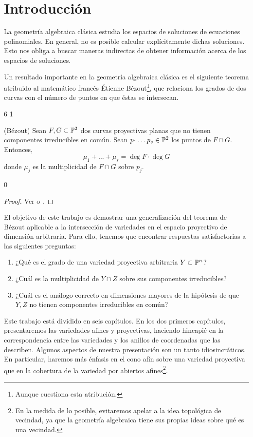 \chapter*{Introducción}

\noindent La geometría algebraica clásica estudia los espacios de soluciones de ecuaciones polinomiales. En general, no es posible calcular explícitamente dichas soluciones. Esto nos obliga a buscar maneras indirectas de obtener información acerca de los espacios de soluciones.

Un resultado importante en la geometría algebraica clásica es el siguiente teorema atribuido al matemático francés Étienne Bézout\footnote{Aunque \cite[p. 51]{kirwan} cuestiona esta atribución.}, que relaciona los grados de dos curvas con el número de puntos en que éstas se intersecan.

\setcounter{chapter} 6
\setcounter{counter} 1
\begin{theorem}
(Bézout) Sean $F, G \subset \P^2$ dos curvas proyectivas planas que no tienen componentes irreducibles en común. Sean $p_1 \dots p_s \in \P^2$ los puntos de $F \cap G$. Entonces,
$$\mu_1 + \dots + \mu_s = \deg F \cdot \deg G$$
donde $\mu_j$ es la multiplicidad de $F \cap G$ sobre $p_j$.
\end{theorem}
\setcounter{chapter} 0

\begin{proof}
Ver \cite[pp. 112-115]{fulton} o \cite[pp. 62-63]{kirwan}.
\end{proof}

El objetivo de este trabajo es demostrar una generalización del teorema de Bézout aplicable a la intersección de variedades en el espacio proyectivo de dimensión arbitraria. Para ello, tenemos que encontrar respuestas satisfactorias a las siguientes preguntas:

\begin{enumerate}
    \item ¿Qué es el grado de una variedad proyectiva arbitraria $Y \subset \P^n$?
    \item ¿Cuál es la multiplicidad de $Y \cap Z$ sobre sus componentes irreducibles?
    \item ¿Cuál es el análogo correcto en dimensiones mayores de la hipótesis de que $Y, Z$ no tienen componentes irreducibles en común?
\end{enumerate}

Este trabajo está dividido en seis capítulos. En los dos primeros capítulos, presentaremos las variedades afines y proyectivas, haciendo hincapié en la correspondencia entre las variedades y los anillos de coordenadas que las describen. Algunos aspectos de nuestra presentación son un tanto idiosincráticos. En particular, haremos más énfasis en el cono afín sobre una variedad proyectiva que en la cobertura de la variedad por abiertos afines\footnote{En la medida de lo posible, evitaremos apelar a la idea topológica de vecindad, ya que la geometría algebraica tiene sus propias ideas sobre qué es una vecindad.}.

